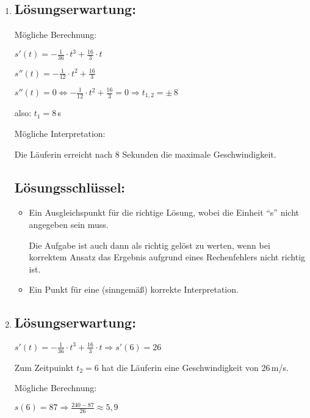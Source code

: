 \begin{langesbeispiel}
{\begin{enumerate}
\begin{itemize}
		Die Aufgabe ist auch dann als richtig gelöst zu werten, wenn bei korrektem Ansatz das Ergebnis aufgrund eines Rechenfehlers nicht richtig ist.
	\end{itemize}
	
	\item \subsection{Lösungserwartung:}
			
	Mögliche Berechnung:
	
	$s'(t)=-\frac{1}{36}\cdot t^3+\frac{16}{3}\cdot t$
	
	$s''(t)=-\frac{1}{12}\cdot t^2+\frac{16}{3}$
	
	$s''(t)=0 \Leftrightarrow -\frac{1}{12}\cdot t^2+\frac{16}{3}=0 \Rightarrow t_{1,2}=\pm\,8$
	
	also: $t_1=8$\,s\leer
	
	Mögliche Interpretation:
	
	Die Läuferin erreicht nach 8 Sekunden die maximale Geschwindigkeit.

	\subsection{Lösungsschlüssel:}
	
\begin{itemize}
	\item Ein Ausgleichspunkt für die richtige Lösung, wobei die Einheit "`s"' nicht angegeben sein muss.  
	
	Die Aufgabe ist auch dann als richtig gelöst zu werten, wenn bei korrektem Ansatz das Ergebnis aufgrund eines Rechenfehlers nicht richtig ist. 
	\item Ein Punkt für eine (sinngemäß) korrekte Interpretation.
\end{itemize}

\item \subsection{Lösungserwartung:}
			
$s'(t)=-\frac{1}{36}\cdot t^3+\frac{16}{3}\cdot t \Rightarrow s'(6)=26$

Zum Zeitpuinkt $t_2=6$ hat die Läuferin eine Geschwindigkeit von 26\,m/s.\leer

Mögliche Berechnung:

$s(6)=87 \Rightarrow \frac{240-87}{26}\approx 5,9$


\end{enumerate}}
\end{langesbeispiel}
